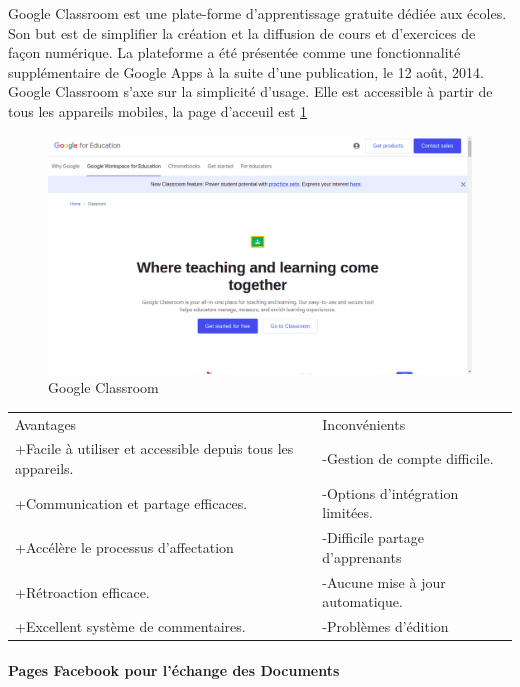 \documentclass[12pt]{report}
\begin{document}
Google Classroom est une plate-forme d'apprentissage gratuite dédiée aux écoles. Son but est de simplifier la création et la diffusion de cours et d'exercices de façon numérique. La plateforme a été présentée comme une fonctionnalité supplémentaire de Google Apps à la suite d'une publication, le 12 août, 2014. Google Classroom s'axe sur la simplicité d'usage. Elle est accessible à partir de tous les appareils mobiles, la page d'acceuil est \ref{fig:googleclassroom}
\begin{figure}[h]
    \centering
    \includegraphics[width=.8\textwidth]{google classroom}
    \caption{Google Classroom}
    \label{fig:googleclassroom}
\end{figure}

\begin{table}[h!]
\begin{center}
\begin{tabular}{ p{8cm}  p{8cm}  }
Avantages & Inconvénients \\
+Facile à utiliser et accessible depuis tous les appareils. & -Gestion de compte difficile. \\ 
+Communication et partage efficaces. & -Options d'intégration limitées. \\
+Accélère le processus d'affectation & -Difficile partage d'apprenants \\
+Rétroaction efficace. & -Aucune mise à jour automatique.\\
+Excellent système de commentaires.&  -Problèmes d'édition 
\end{tabular}
\end{center}
\end{table}

\newpage
\paragraph{Pages Facebook pour l'échange des Documents}
\end{document}
